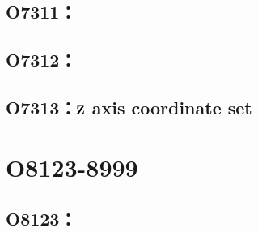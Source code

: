 \clearpage
\subsection{O7311：}



\subsection{O7312：}



\subsection[O7313：\texorpdfstring{$Z$} axis coordinate set]{O7313：$\textbf Z$ axis coordinate set}




\clearpage
\section{O8123-8999}


\subsection{O8123：}



\clearpage
